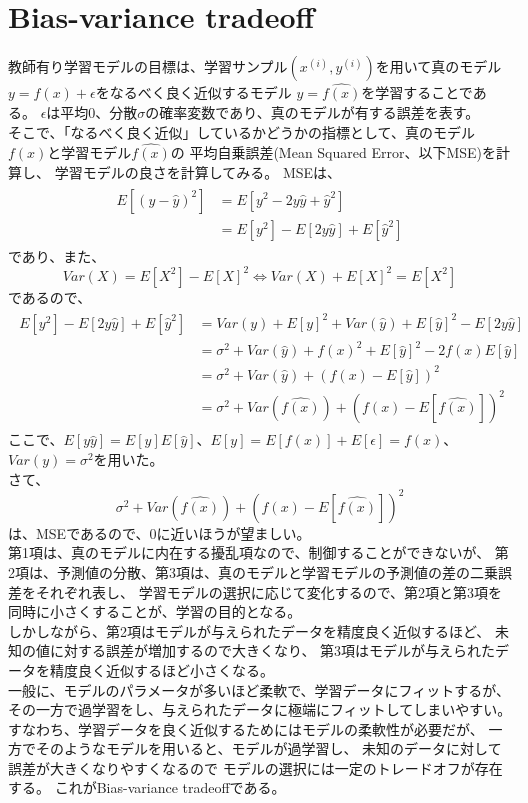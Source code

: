 \documentclass[a4j]{jarticle}
\begin{document}
\section{Bias-variance tradeoff}

教師有り学習モデルの目標は、学習サンプル$(x^{(i)},y^{(i)})$を用いて真のモデル$y=f(x)+\epsilon$をなるべく良く近似するモデル
$y=\hat{f(x)}$を学習することである。
$\epsilon$は平均0、分散$\sigma$の確率変数であり、真のモデルが有する誤差を表す。\\
そこで、「なるべく良く近似」しているかどうかの指標として、真のモデル$f(x)$と学習モデル$\hat{f(x)}$の
平均自乗誤差(Mean Squared Error、以下MSE)を計算し、
学習モデルの良さを計算してみる。
MSEは、
\begin{align}
    \begin{aligned}
    E[(y-\hat{y})^2]&=E[y^2-2y\hat{y}+\hat{y}^2]\\
    &=E[y^2]-E[2y\hat{y}]+E[\hat{y}^2]
    \end{aligned}
\end{align}
であり、また、
\begin{equation}
    Var(X)=E[X^2]-E[X]^2 \Leftrightarrow Var(X)+E[X]^2=E[X^2]
\end{equation}
であるので、
\begin{align}
    \begin{aligned}
    E[y^2]-E[2y\hat{y}]+E[\hat{y}^2]&=Var(y)+E[y]^2+Var(\hat{y})+E[\hat{y}]^2-E[2y\hat{y}] \\
    &=\sigma^2+Var(\hat{y})+f(x)^2+E[\hat{y}]^2-2f(x)E[\hat{y} ]\\
    &=\sigma^2+Var(\hat{y})+(f(x)-E[\hat{y}])^2 \\
    &=\sigma^2+Var(\hat{f(x)})+(f(x)-E[\hat{f(x)}])^2
    \end{aligned}
\end{align}
ここで、$E[y\hat{y}]=E[y]E[\hat{y}]$、$E[y]=E[f(x)]+E[\epsilon]=f(x)$、$Var(y)=\sigma^2$を用いた。\\
さて、
\begin{equation}
    \sigma^2+Var(\hat{f(x)})+(f(x)-E[\hat{f(x)}])^2
\end{equation}
は、MSEであるので、0に近いほうが望ましい。\\
第1項は、真のモデルに内在する擾乱項なので、制御することができないが、
第2項は、予測値の分散、第3項は、真のモデルと学習モデルの予測値の差の二乗誤差をそれぞれ表し、
学習モデルの選択に応じて変化するので、第2項と第3項を同時に小さくすることが、学習の目的となる。\\
しかしながら、第2項はモデルが与えられたデータを精度良く近似するほど、
未知の値に対する誤差が増加するので大きくなり、
第3項はモデルが与えられたデータを精度良く近似するほど小さくなる。\\
一般に、モデルのパラメータが多いほど柔軟で、学習データにフィットするが、
その一方で過学習をし、与えられたデータに極端にフィットしてしまいやすい。
すなわち、学習データを良く近似するためにはモデルの柔軟性が必要だが、
一方でそのようなモデルを用いると、モデルが過学習し、
未知のデータに対して誤差が大きくなりやすくなるので
モデルの選択には一定のトレードオフが存在する。
これがBias-variance tradeoffである。
\end{document}
